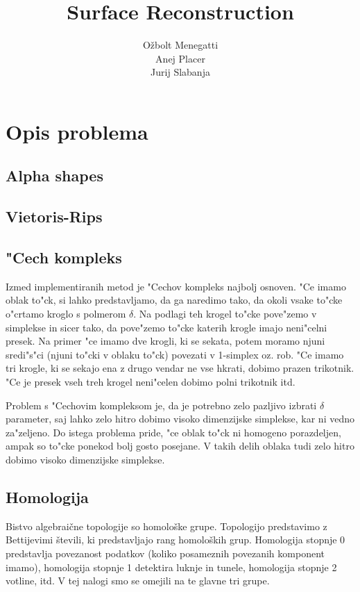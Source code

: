\documentclass[11pt]{article}
\title{\textbf{Surface Reconstruction}}
\author{O\v zbolt Menegatti\\
		Anej Placer\\
		Jurij Slabanja}
\date{}
\begin{document}
\maketitle

\section{Opis problema}

\subsection{Alpha shapes}

\subsection{Vietoris-Rips}

\subsection{"Cech kompleks}
Izmed implementiranih metod je "Cechov kompleks najbolj osnoven. "Ce imamo oblak to"ck, si lahko predstavljamo, da ga naredimo tako, da okoli vsake to"cke o"crtamo kroglo s polmerom $\delta$. Na podlagi teh krogel to"cke pove"zemo v simplekse in sicer tako, da pove"zemo to"cke katerih krogle imajo neni"celni presek. Na primer "ce imamo dve krogli, ki se sekata, potem moramo njuni sredi"s"ci (njuni to"cki v oblaku to"ck) povezati v 1-simplex oz. rob. "Ce imamo tri krogle, ki se sekajo ena z drugo vendar ne vse hkrati, dobimo prazen trikotnik. "Ce je presek vseh treh krogel neni"celen dobimo polni trikotnik itd. 

Problem s "Cechovim kompleksom je, da je potrebno zelo pazljivo izbrati $\delta$ parameter, saj lahko zelo hitro dobimo visoko dimenzijske simplekse, kar ni vedno za"zeljeno. Do istega problema pride, "ce oblak to"ck ni homogeno porazdeljen, ampak so to"cke ponekod bolj gosto posejane. V takih delih oblaka tudi zelo hitro dobimo visoko dimenzijske simplekse.

\subsection{Homologija}

Bistvo algebraične topologije so homološke grupe. Topologijo predstavimo z Bettijevimi števili, ki predstavljajo rang homoloških grup. Homologija stopnje 0 predstavlja povezanost podatkov (koliko posameznih povezanih komponent imamo), homologija stopnje 1 detektira luknje in tunele, homologija stopnje 2 votline, itd. V tej nalogi smo se omejili na te glavne tri grupe. 
\end{document}
